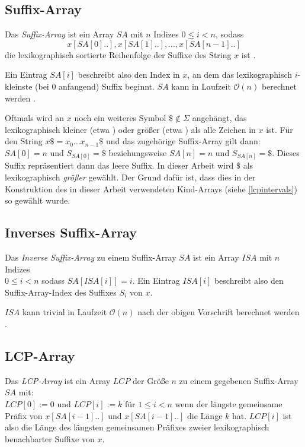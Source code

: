 \subsection{Suffix-Array}

Das \emph{Suffix-Array} ist ein Array $SA$ mit $n$ Indizes $0 \leq i < n$, sodass 
\begin{equation*}
	x[SA[0]..], x[SA[1]..], \dots, x[SA[n-1]..]
\end{equation*}
die lexikographisch sortierte Reihenfolge der Suffixe des String $x$ ist \cite{abouelhoda_replacing_2004, manber_suffix_1993}.

Ein Eintrag $SA[i]$ beschreibt also den Index in $x$, an dem das lexikographisch $i$-kleinste (bei $0$ anfangend) Suffix beginnt. $SA$ kann in Laufzeit $\mathcal{O}(n)$ berechnet werden \cite{nong_two_2011}. 

Oftmals wird an $x$ noch ein weiteres Symbol $\$ \notin \Sigma$ angehängt, das lexikographisch kleiner (etwa \cite{fischer_inducing_2011, nong_two_2011}) oder größer (etwa \cite{abouelhoda_optimal_2002}) als alle Zeichen in $x$ ist. Für den String $x\$ = x_0\dots x_{n-1} \$$ und das zugehörige Suffix-Array gilt dann: $SA[0] = n$ und $S_{SA[0]} = \$$ beziehungsweise $SA[n] = n$ und $S_{SA[n]} = \$$. 
Dieses Suffix repräsentiert dann das leere Suffix. In dieser Arbeit wird $\$$ als lexikographisch \textit{größer} gewählt. Der Grund dafür ist, dass dies in der Konstruktion des in dieser Arbeit verwendeten Kind-Arrays \cite{abouelhoda_optimal_2002} (siehe \autoref{lcpintervals}) so gewählt wurde. 

\subsection{Inverses Suffix-Array}

Das \emph{Inverse Suffix-Array} zu einem Suffix-Array $SA$ ist ein Array $ISA$ mit $n$ Indizes \\
$0 \leq i < n$ sodass $SA[ISA[i]] = i$.
Ein Eintrag $ISA[i]$ beschreibt also den Suffix-Array-Index des Suffixes $S_i$ von $x$.

$ISA$ kann trivial in Laufzeit $\mathcal{O}(n)$ nach der obigen Vorschrift berechnet werden \cite{abouelhoda_replacing_2004}.

\subsection{LCP-Array}

Das \emph{LCP-Array} ist ein Array $LCP$ der Größe $n$ zu einem gegebenen Suffix-Array $SA$ mit:\\
$LCP[0] := 0$ und $LCP[i] := k$ für $1 \leq i < n$ wenn der längste gemeinsame Präfix von $x[SA[i-1]..]$ und $x[SA[i-1]..]$ die Länge $k$ hat. $LCP[i]$ ist also die Länge des längsten gemeinsamen Präfixes zweier lexikographisch benachbarter Suffixe von $x$. 


